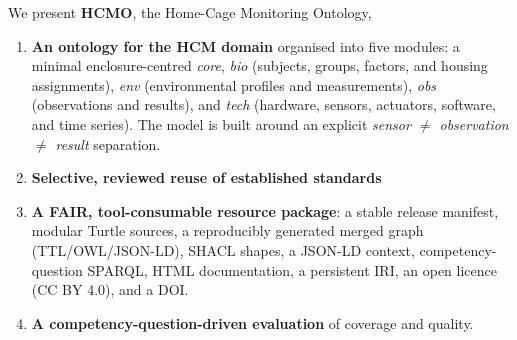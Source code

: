 We present \textbf{HCMO}, the Home-Cage Monitoring Ontology, 

\begin{enumerate}
\item \textbf{An ontology for the HCM domain} organised into five modules: a minimal
enclosure-centred \emph{core}, \emph{bio} (subjects, groups, factors, and housing assignments), \emph{env} (environmental profiles and measurements), \emph{obs} (observations and results), and \emph{tech} (hardware, sensors, actuators, software, and time series). The model is built around an explicit \emph{sensor $\neq$ observation $\neq$ result} separation.

\item \textbf{Selective, reviewed reuse of established standards} 

\item \textbf{A FAIR, tool-consumable resource package}: a stable release manifest,
modular Turtle sources, a reproducibly generated merged graph (TTL/OWL/JSON-LD), SHACL shapes, a JSON-LD context, competency-question SPARQL, HTML documentation, a persistent IRI, an open licence (CC BY 4.0), and a DOI.

\item \textbf{A competency-question-driven evaluation} of coverage and quality.
\end{enumerate}

